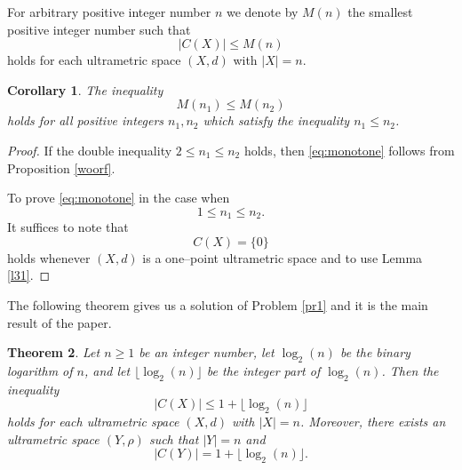\documentclass[pdflatex,sn-mathphys-num]{sn-jnl}%
\theoremstyle{thmstyleone}%
\newtheorem{Theorem}{Theorem}[section]
\newtheorem{Corollary}[Theorem]{Corollary}
\theoremstyle{thmstyletwo}%
\theoremstyle{thmstylethree}%
\theoremstyle{thmstyletwo}%
\theoremstyle{thmstylethree}%
\begin{document}
For arbitrary positive integer number $n$ we denote by $M(n)$  the smallest positive integer number such that
\begin{equation*}
|C(X)| \le M(n)
\end{equation*}
holds for each  ultrametric space $(X,d)$ with $|X|=n$.
 

\begin{Corollary}\label{jjgfd}
The inequality
\begin{equation}
M(n_1) \le M(n_2)
\label{eq:monotone}
\end{equation}
holds for all positive integers $n_1,n_2$ which satisfy the inequality $n_1 \le n_2$.
\end{Corollary}


\begin{proof}
If the double inequality $2 \le n_1 \le n_2$ holds, then \eqref{eq:monotone} follows from Proposition \ref{woorf}.

To prove \eqref{eq:monotone} in the case when 
\begin{equation*}
    1 \le n_1 \le n_2.
\end{equation*}
It suffices to note that
\begin{equation*}
C(X)=\{0\}
\end{equation*}
holds whenever $(X,d)$ is a one--point ultrametric space and to use Lemma \ref{l31}.
\end{proof}

The following theorem gives us a solution of Problem \ref{pr1} and it is the main result of the paper.


\begin{Theorem}\label{ter1}
Let $n \ge 1$ be an integer number, 
let $\log_2(n)$ be the binary logarithm of $n$, and let $\lfloor \log_2(n) \rfloor$ be the integer part of $\log_2(n)$.
Then the inequality
\begin{equation}\label{kam1}
|C(X)| \leq 1 + \lfloor \log_2 (n) \rfloor
\end{equation}
holds for each ultrametric space $(X,d)$ with $|X|=n$.
Moreover, there exists an ultrametric space $(Y,\rho)$ such that $|Y|=n$
and
\begin{equation}
    \label{kam2}
|C(Y)| = 1 + \lfloor \log_2(n) \rfloor .
\end{equation}
\end{Theorem}
\end{document}
